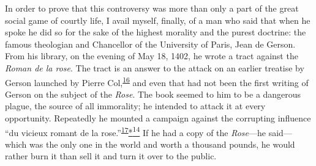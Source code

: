 In order to prove that this controversy was more than only a part of the
great social game of courtly life, I avail myself, finally, of a man who
said that when he spoke he did so for the sake of the highest morality
and the purest doctrine: the famous theologian and Chancellor of the
University of Paris, Jean de Gerson. From his library, on the evening of
May 18, 1402, he wrote a tract against the \emph{Roman de la rose}. The
tract is an answer to the attack on an earlier treatise by Gerson
launched by Pierre
Col,\textsuperscript{\protect\hypertarget{11_Chapter_Four__THE_FORMS_OF_LOVE.xhtmlux5cux23id_1456}{\protect\hyperlink{23_NOTES.xhtmlux5cux23id_1457}{16}}}
and even that had not been the first writing of Gerson on the subject of
the \emph{Rose}. The book seemed to him to be a dangerous plague, the
source of all immorality; he intended to attack it at every opportunity.
Repeatedly he mounted a campaign against the corrupting influence ``du
vicieux romant de la
rose.''\textsuperscript{\protect\hypertarget{11_Chapter_Four__THE_FORMS_OF_LOVE.xhtmlux5cux23id_1454}{\protect\hyperlink{23_NOTES.xhtmlux5cux23id_1455}{17}}}\protect\hypertarget{11_Chapter_Four__THE_FORMS_OF_LOVE.xhtmlux5cux23id_3127}{\protect\hyperlink{23_NOTES.xhtmlux5cux23id_3128}{*\textsuperscript{14}}}
If he had a copy of the \emph{Rose}---he said---which was the only one
in the world and worth a thousand pounds, he would rather burn it than
sell it and turn it over to the public.

